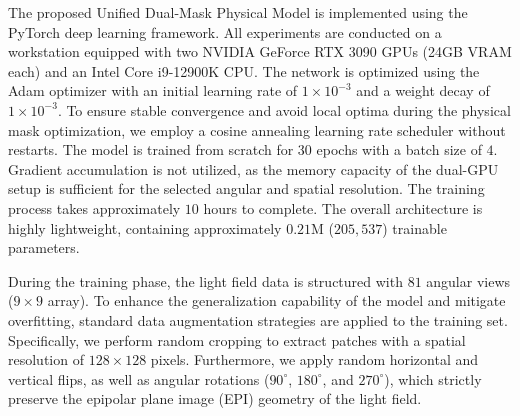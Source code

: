 \documentclass[lettersize,journal]{IEEEtran}
\begin{document}
\begin{table}[htbp]
  \centering
  \caption{Summary of the light field datasets utilized for evaluating the proposed Unified Dual-Mask Physical Model.}
  \label{tab:datasets}
\end{table}

The proposed Unified Dual-Mask Physical Model is implemented using the PyTorch deep learning framework. All experiments are conducted on a workstation equipped with two NVIDIA GeForce RTX 3090 GPUs (24GB VRAM each) and an Intel Core i9-12900K CPU. The network is optimized using the Adam optimizer with an initial learning rate of $1 \times 10^{-3}$ and a weight decay of $1 \times 10^{-3}$. To ensure stable convergence and avoid local optima during the physical mask optimization, we employ a cosine annealing learning rate scheduler without restarts. The model is trained from scratch for $30$ epochs with a batch size of $4$. Gradient accumulation is not utilized, as the memory capacity of the dual-GPU setup is sufficient for the selected angular and spatial resolution. The training process takes approximately $10$ hours to complete. The overall architecture is highly lightweight, containing approximately $0.21$M ($205,537$) trainable parameters.

During the training phase, the light field data is structured with $81$ angular views ($9 \times 9$ array). To enhance the generalization capability of the model and mitigate overfitting, standard data augmentation strategies are applied to the training set. Specifically, we perform random cropping to extract patches with a spatial resolution of $128 \times 128$ pixels. Furthermore, we apply random horizontal and vertical flips, as well as angular rotations ($90^\circ$, $180^\circ$, and $270^\circ$), which strictly preserve the epipolar plane image (EPI) geometry of the light field.
\end{document}
